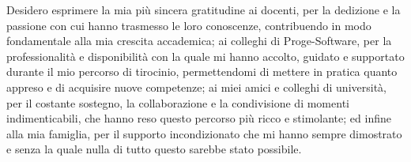Desidero esprimere la mia più sincera gratitudine ai docenti, per la dedizione e la passione con cui hanno
trasmesso le loro conoscenze, contribuendo in modo fondamentale alla mia crescita accademica;
ai colleghi di Proge-Software, per la professionalità e disponibilità con la quale mi hanno accolto,
guidato e supportato durante il mio percorso di tirocinio, permettendomi di mettere in pratica quanto appreso
e di acquisire nuove competenze;
ai miei amici e colleghi di università, per il costante sostegno, la collaborazione e la condivisione
di momenti indimenticabili, che hanno reso questo percorso più ricco e stimolante;
ed infine alla mia famiglia, per il supporto incondizionato che mi hanno
sempre dimostrato e senza la quale nulla di tutto questo sarebbe stato possibile.
